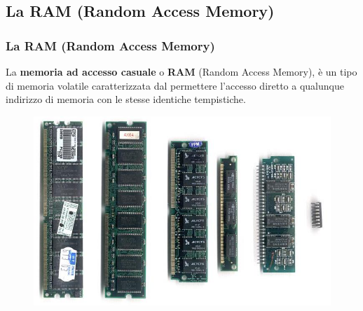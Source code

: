 \subsection[La RAM (Random Access Memory)]{La RAM (Random Access Memory)}
\begin{frame}
	\frametitle{La RAM (Random Access Memory)}
	  
	\begin{block}{}
		La \textbf{memoria ad accesso casuale} o \textbf{RAM} (Random Access Memory), è un tipo di memoria volatile caratterizzata dal permettere l'accesso diretto a qualunque indirizzo di memoria con le stesse identiche tempistiche.
		
		\begin{figure}[!htbp]
			\centering
			\includegraphics[width=0.58\linewidth]{images/5_memory/ram.jpg}
			\label{fig:memory_ram}
		\end{figure}
	\end{block}
\end{frame}



